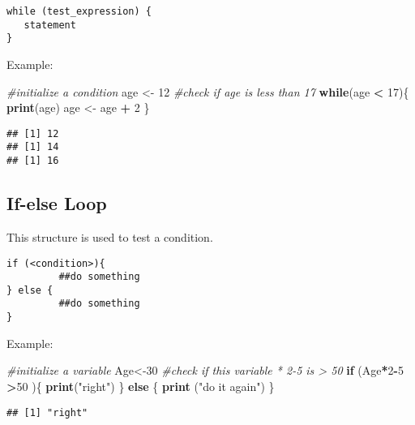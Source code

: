 \documentclass[]{book}
\newenvironment{Shaded}{\begin{snugshade}}{\end{snugshade}}
\newcommand{\KeywordTok}[1]{\textcolor[rgb]{0.13,0.29,0.53}{\textbf{#1}}}
\newcommand{\DecValTok}[1]{\textcolor[rgb]{0.00,0.00,0.81}{#1}}
\newcommand{\StringTok}[1]{\textcolor[rgb]{0.31,0.60,0.02}{#1}}
\newcommand{\CommentTok}[1]{\textcolor[rgb]{0.56,0.35,0.01}{\textit{#1}}}
\newcommand{\ControlFlowTok}[1]{\textcolor[rgb]{0.13,0.29,0.53}{\textbf{#1}}}
\newcommand{\OperatorTok}[1]{\textcolor[rgb]{0.81,0.36,0.00}{\textbf{#1}}}
\newcommand{\NormalTok}[1]{#1}
\theoremstyle{definition}
\theoremstyle{definition}
\theoremstyle{definition}
\theoremstyle{remark}
\begin{document}
\begin{verbatim}
while (test_expression) {
   statement
}
\end{verbatim}

Example:

\begin{Shaded}
\begin{Highlighting}[]
\CommentTok{#initialize a condition}
\NormalTok{age <-}\StringTok{ }\DecValTok{12}
\CommentTok{#check if age is less than 17}
\ControlFlowTok{while}\NormalTok{(age }\OperatorTok{<}\StringTok{ }\DecValTok{17}\NormalTok{)\{}
         \KeywordTok{print}\NormalTok{(age)}
\NormalTok{         age <-}\StringTok{ }\NormalTok{age }\OperatorTok{+}\StringTok{ }\DecValTok{2} 
\NormalTok{\}}
\end{Highlighting}
\end{Shaded}

\begin{verbatim}
## [1] 12
## [1] 14
## [1] 16
\end{verbatim}

\subsection{If-else Loop}\label{if-else-loop}

This structure is used to test a condition.

\begin{verbatim}
if (<condition>){
         ##do something
} else {
         ##do something
}
\end{verbatim}

Example:

\begin{Shaded}
\begin{Highlighting}[]
\CommentTok{#initialize a variable}
\NormalTok{Age<-}\DecValTok{30}
\CommentTok{#check if this variable * 2-5 is > 50}
\ControlFlowTok{if}\NormalTok{ (Age}\OperatorTok{*}\DecValTok{2}\OperatorTok{-}\DecValTok{5} \OperatorTok{>}\DecValTok{50}\NormalTok{ )\{}
       \KeywordTok{print}\NormalTok{(}\StringTok{"right"}\NormalTok{)}
\NormalTok{\} }\ControlFlowTok{else}\NormalTok{ \{}
       \KeywordTok{print}\NormalTok{ (}\StringTok{"do it again"}\NormalTok{)}
\NormalTok{\}}
\end{Highlighting}
\end{Shaded}

\begin{verbatim}
## [1] "right"
\end{verbatim}
\end{document}
